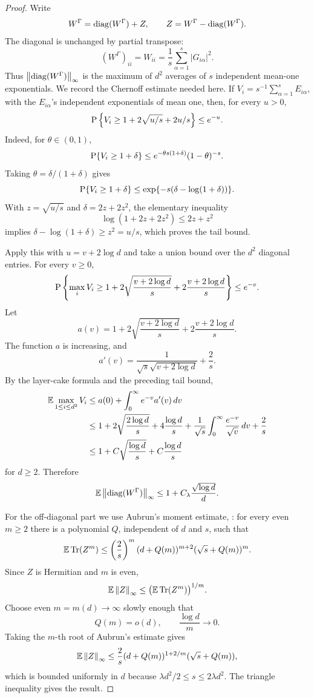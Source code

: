 \begin{proof}
Write
\[
  W^\Gamma=\operatorname{diag}(W^\Gamma)+Z,\qquad Z=W^\Gamma-\operatorname{diag}(W^\Gamma).
\]
The diagonal is unchanged by partial transpose:
\[
  (W^\Gamma)_{ii}=W_{ii}
  =
  \frac1s\sum_{\alpha=1}^s |G_{i\alpha}|^2.
\]
Thus \(\left\lVert\operatorname{diag}(W^\Gamma)\right\rVert_\infty\) is the maximum of \(d^2\) averages of
\(s\) independent mean-one exponentials.  We record the Chernoff estimate
needed here.  If \(V_i=s^{-1}\sum_{\alpha=1}^s E_{i\alpha}\), with the
\(E_{i\alpha}\)'s independent exponentials of mean one, then, for every
\(u>0\),
\[
  \operatorname{P}\left\{
    V_i\ge 1+2\sqrt{u/s}+2u/s
  \right\}\le e^{-u}.
\]
Indeed, for \(\theta\in(0,1)\),
\[
  \operatorname{P}\{V_i\ge 1+\delta\}
  \le
  e^{-\theta s(1+\delta)}(1-\theta)^{-s}.
\]
Taking \(\theta=\delta/(1+\delta)\) gives
\[
  \operatorname{P}\{V_i\ge 1+\delta\}
  \le
  \exp\{-s(\delta-\log(1+\delta))\}.
\]
With \(z=\sqrt{u/s}\) and \(\delta=2z+2z^2\), the elementary inequality
\[
  \log(1+2z+2z^2)\le 2z+z^2
\]
implies \(\delta-\log(1+\delta)\ge z^2=u/s\), which proves the tail bound.

Apply this with \(u=v+2\log d\) and take a union bound over the \(d^2\)
diagonal entries.  For every \(v\ge0\),
\[
  \operatorname{P}\left\{
    \max_i V_i
    \ge
    1+2\sqrt{\frac{v+2\log d}{s}}
      +2\frac{v+2\log d}{s}
  \right\}
  \le e^{-v}.
\]
Let
\[
  a(v)=
  1+2\sqrt{\frac{v+2\log d}{s}}
    +2\frac{v+2\log d}{s}.
\]
The function \(a\) is increasing, and
\[
  a'(v)=
  \frac1{\sqrt{s}\sqrt{v+2\log d}}+\frac2s.
\]
By the layer-cake formula and the preceding tail bound,
\[
\begin{aligned}
  \operatorname{\mathbb{E}}\max_{1\le i\le d^2}V_i
  &\le
  a(0)+\int_0^\infty e^{-v}a'(v)\,dv                         \\
  &\le
  1+2\sqrt{\frac{2\log d}{s}}
    +4\frac{\log d}{s}
    +\frac1{\sqrt{s}}\int_0^\infty \frac{e^{-v}}{\sqrt v}\,dv
    +\frac2s                                                    \\
  &\le
  1+C\sqrt{\frac{\log d}{s}}
    +C\frac{\log d}{s}
\end{aligned}
\]
for \(d\ge2\).
Therefore
\[
  \operatorname{\mathbb{E}}\left\lVert\operatorname{diag}(W^\Gamma)\right\rVert_\infty
  \le
  1+C_\lambda\frac{\sqrt{\log d}}{d}.
\]

For the off-diagonal part we use Aubrun's moment estimate,
\cite[Lemma~3.4]{Aubrun12}: for every even \(m\ge2\) there is a polynomial
\(Q\), independent of \(d\) and \(s\), such that
\[
  \operatorname{\mathbb{E}}\operatorname{Tr}(Z^m)
  \le
  \left(\frac2s\right)^m
  (d+Q(m))^{m+2}(\sqrt s+Q(m))^m.
\]
Since \(Z\) is Hermitian and \(m\) is even,
\[
  \operatorname{\mathbb{E}}\left\lVert Z\right\rVert_\infty
  \le
  \bigl(\operatorname{\mathbb{E}}\operatorname{Tr}(Z^m)\bigr)^{1/m}.
\]
Choose even \(m=m(d)\to\infty\) slowly enough that
\[
  Q(m)=o(d),\qquad \frac{\log d}{m}\to0.
\]
Taking the \(m\)-th root of Aubrun's estimate gives
\[
  \operatorname{\mathbb{E}}\left\lVert Z\right\rVert_\infty
  \le
  \frac2s(d+Q(m))^{1+2/m}(\sqrt s+Q(m)),
\]
which is bounded uniformly in \(d\) because
\(\lambda d^2/2\le s\le2\lambda d^2\).  The triangle inequality gives the
result.
\end{proof}


